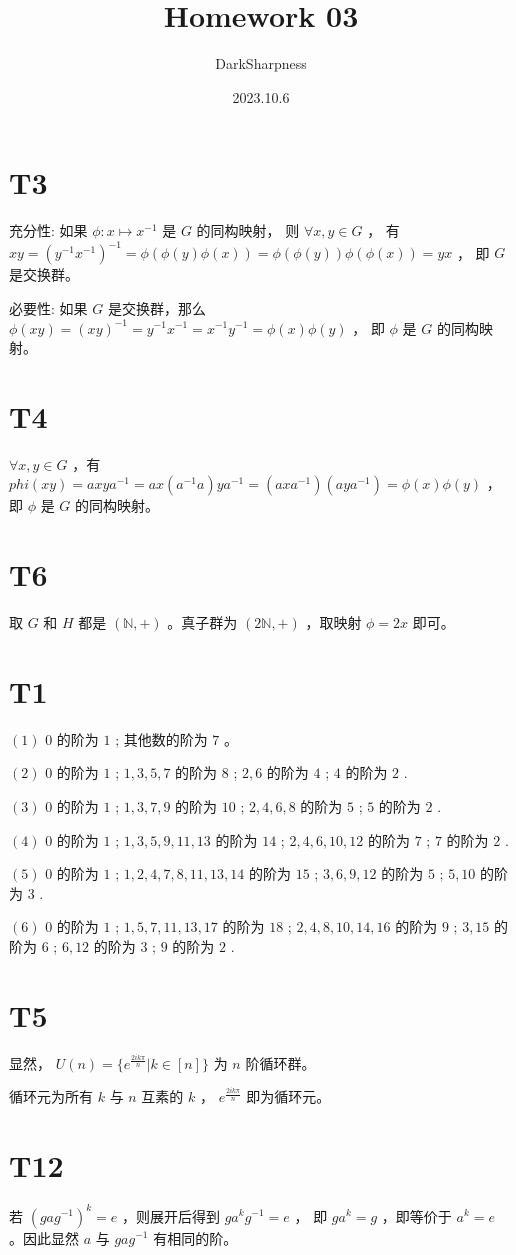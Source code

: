 \documentclass[fontset=windows]{article}
\title{\heiti\zihao{2} Homework 03}
\author{DarkSharpness}
\date{2023.10.6}
\begin{document}
	\maketitle
    \tableofcontents

\section*{T3}

充分性: 如果 $\phi : x \longmapsto x^{-1}$ 是 $G$ 的同构映射， 则 $\forall x, y \in G$ ， 有 $x y = (y^{-1}x^{-1})^{-1} =  \phi(\phi(y)\phi(x)) = \phi(\phi(y)) \phi(\phi(x)) = y x$ ， 即 $G$ 是交换群。

必要性: 如果 $G$ 是交换群，那么 $\phi(xy) = (xy)^{-1} = y^{-1}x^{-1} = x^{-1}y^{-1} = \phi(x)\phi(y)$ ， 即 $\phi$ 是 $G$ 的同构映射。

\section*{T4}

$\forall x, y \in G$ ，有 $phi(xy) = axya^{-1} = ax(a^{-1}a)ya^{-1} = (axa^{-1})(aya^{-1}) = \phi(x)\phi(y)$ ， 即 $\phi$ 是 $G$ 的同构映射。

\section*{T6}

取 $G$ 和 $H$ 都是 $(\mathbb{N},+)$ 。真子群为 $(2\mathbb{N},+)$ ，取映射 $\phi = 2x$ 即可。

\section*{T1}

$(1)$  $0$ 的阶为 $1$ ; 其他数的阶为 $7$ 。

$(2)$  $0$ 的阶为 $1$ ; $1,3,5,7$ 的阶为 $8$ ; $2,6$ 的阶为 $4$ ; $4$ 的阶为 $2$ .

$(3)$  $0$ 的阶为 $1$ ; $1,3,7,9$ 的阶为 $10$ ; $2,4,6,8$ 的阶为 $5$ ; $5$ 的阶为 $2$ .

$(4)$  $0$ 的阶为 $1$ ; $1,3,5,9,11,13$ 的阶为 $14$ ; $2,4,6,10,12$ 的阶为 $7$ ; $7$ 的阶为 $2$ .

$(5)$  $0$ 的阶为 $1$ ; $1,2,4,7,8,11,13,14$ 的阶为 $15$ ; $3,6,9,12$ 的阶为 $5$ ; $5,10$ 的阶为 $3$ .

$(6)$  $0$ 的阶为 $1$ ; $1,5,7,11,13,17$ 的阶为 $18$ ; $2,4,8,10,14,16$ 的阶为 $9$ ; $3,15$ 的阶为 $6$ ; $6,12$ 的阶为 $3$ ; $9$ 的阶为 $2$ .


\section*{T5}

显然， $U(n) = \{ e^{\frac{2i k \pi}{n}} | k \in [n] \}$ 为 $n$ 阶循环群。

循环元为所有 $k$ 与 $n$ 互素的 $k$ ， $e^{\frac{2i k \pi}{n}} $ 即为循环元。

\section*{T12}

若 $(g a g^{-1})^k = e$ ，则展开后得到 $g a^k g^{-1} = e$ ， 即 $ga^k = g$ ，即等价于 $a^k = e$ 。因此显然 $a$ 与 $gag^{-1}$ 有相同的阶。 
\end{document}
